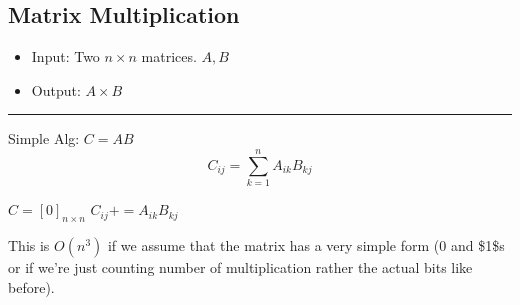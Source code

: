\documentclass[11pt]{article}
\begin{document}
\subsection{Matrix Multiplication}
\label{sec:orga073259}
\begin{itemize}
\item Input: Two \(n\times n\) matrices. \(A,B\)
\item Output: \(A \times B\)
\end{itemize}

\noindent\rule{\textwidth}{0.5pt}
Simple Alg: \(C=AB\)
$$C_{ij}=\sum_{k=1}^{n}A_{ik}B_{kj}$$
\begin{algorithmic}
\State $C=[0]_{n\times n}$
			\State $C_{ij}+=A_{ik}B_{kj}$
		\EndFor
	\EndFor
\EndFor
\end{algorithmic}
This is \(O(n^3)\) if we assume that the matrix has a very simple form (\(0\) and \$1\$s or if we're just counting number of multiplication rather the actual bits like before).
\end{document}
